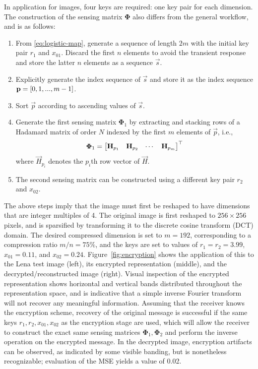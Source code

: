 In application for images, four keys are required: one key pair for each dimension. The construction of the sensing matrix $\bm\Phi$ also differs from the general workflow, and is as follows:

\begin{enumerate}
	\item From \eqref{eq:logistic-map}, generate a sequence of length $2m$ with the initial key pair $r_1$ and $x_{01}$. Discard the first $n$ elements to avoid the transient response and store the latter $n$ elements as a sequence $\vec{s}$.
	\item Explicitly generate the index sequence of $\vec{s}$ and store it as the index sequence $\text{\bfseries p} = \qty[0, 1, ..., m-1]$.
	\item Sort $\vec{p}$ according to ascending values of $\vec{s}$.
	\item Generate the first sensing matrix $\bm\Phi_1$ by extracting and stacking rows of a Hadamard matrix of order $N$ indexed by the first $m$ elements of $\vec{p}$, i.e.,
	\begin{equation}\label{eq:construct-hadamard}
		\bm\Phi_1 = \mqty[
			\vec{H}_{p_1} & \vec{H}_{p_2} & \cdots & \vec{H}_{p_m}
		]^\top
	\end{equation}
	\noindent where $\vec{H}_{p_i}$ denotes the $p_i$th row vector of $\vec{H}$.
	\item The second sensing matrix can be constructed using a different key pair $r_2$ and $x_{02}$.
\end{enumerate}

The above steps imply that the image must first be reshaped to have dimensions that are integer multiples of 4. The original image is first reshaped to $256 \times 256$ pixels, and is sparsified by transforming it to the discrete cosine transform (DCT) domain. The desired compressed dimension is set to $m = 192$, corresponding to a compression ratio $m/n = 75\%$, and the keys are set to values of $r_1 = r_2 = 3.99$, $x_{01} = 0.11$, and $x_{02} = 0.24$. Figure~\ref{fig:encryption} shows the application of this to the Lena test image (left), its encrypted representation (middle), and the decrypted/reconstructed image (right). Visual inspection of the encrypted representation shows horizontal and vertical bands distributed throughout the representation space, and is indicative that a simple inverse Fourier transform will not recover any meaningful information. Assuming that the receiver knows the encryption scheme, recovery of the original message is successful if the same keys $r_1, r_2, x_{01}, x_{02}$ as the encryption stage are used, which will allow the receiver to construct the exact same sensing matrices $\bm\Phi_1, \bm\Phi_2$ and perform the inverse operation on the encrypted message. In the decrypted image, encryption artifacts can be observed, as indicated by some visible banding, but is nonetheless recognizable; evaluation of the MSE yields a value of 0.02.

